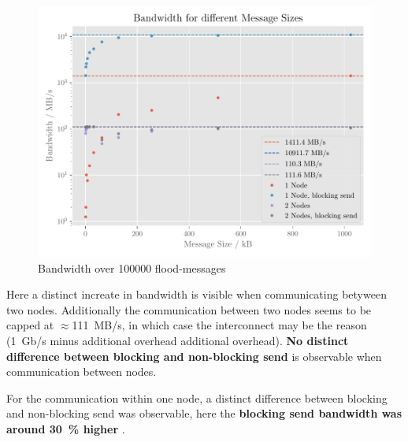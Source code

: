 \documentclass[]{scrartcl}
\begin{document}
\begin{figure}[ht]
    \centering
    \includegraphics[width=\linewidth]{img/bandwidth}
    \caption{Bandwidth over 100000 flood-messages}%
    \label{fig:bandwidth}
\end{figure}

Here a distinct increate in bandwidth is visible when communicating betyween two nodes.
Additionally the communication between two nodes seems to be capped at $\approx$\SI{111}{MB/s}, in which case the interconnect may be the reason (\SI{1}{Gb/s} minus additional overhead additional overhead).
{\bfseries No distinct difference between blocking and non-blocking send} is observable when communication between nodes.

For the communication within one node, a distinct difference between blocking and non-blocking send was observable, here the {\bfseries blocking send bandwidth was around \SI{30}{\%} higher }.
\newpage
\end{document}
